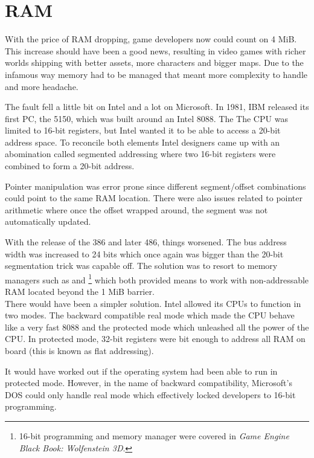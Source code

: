 \section{RAM}
With the price of RAM dropping, game developers now could count on 4 MiB. This increase should have been a good news, resulting in video games with richer worlds shipping with better assets, more characters and bigger maps. Due to the infamous way memory had to be managed that meant more complexity to handle and more headache.\\
\par
The fault fell a little bit on Intel and a lot on Microsoft. In 1981, IBM released its first PC, the 5150,  which was built around an Intel 8088. The The CPU was limited to 16-bit registers, but Intel wanted it to be able to access a 20-bit address space. To reconcile both elements Intel designers came up with an abomination called segmented addressing where two 16-bit registers were combined to form a 20-bit address.\\
\par


\par
Pointer manipulation was error prone since different segment/offset combinations could point to the same RAM location. There were also issues related to pointer arithmetic where once the offset wrapped around, the segment was not automatically updated.\\
\par
With the release of the 386 and later 486, things worsened. The bus address width was increased to 24 bits which once again was bigger than the 20-bit segmentation trick was capable off. The solution was to resort to memory managers such as  and \footnote{16-bit programming and memory manager were covered in \textit{Game Engine Black Book: Wolfenstein 3D}.} which both provided means to work with non-addressable RAM located beyond the 1 MiB barrier.\\

There would have been a simpler solution. Intel allowed its CPUs to function in two modes. The backward compatible real mode which made the CPU behave like a very fast 8088 and the protected mode which unleashed all the power of the CPU. In protected mode, 32-bit registers were bit enough to address all RAM on board (this is known as flat addressing).\\
\par
It would have worked out if the operating system had been able to run in protected mode. However, in the name of backward compatibility, Microsoft's DOS could only handle real mode which effectively locked developers to 16-bit programming.\\ 
\par




